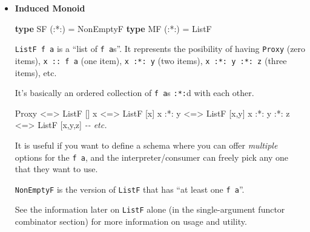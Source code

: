 \documentclass[]{article}
\newenvironment{Shaded}{}{}
\newcommand{\CommentTok}[1]{\textcolor[rgb]{0.38,0.63,0.69}{\textit{#1}}}
\newcommand{\DataTypeTok}[1]{\textcolor[rgb]{0.56,0.13,0.00}{#1}}
\newcommand{\KeywordTok}[1]{\textcolor[rgb]{0.00,0.44,0.13}{\textbf{#1}}}
\newcommand{\NormalTok}[1]{#1}
\newcommand{\OperatorTok}[1]{\textcolor[rgb]{0.40,0.40,0.40}{#1}}
\newcommand{\OtherTok}[1]{\textcolor[rgb]{0.00,0.44,0.13}{#1}}
\renewcommand{\href}[2]{#2\footnote{\url{#1}}}
\begin{document}
\begin{itemize}
  To introduce an ``empty'' branch, we need \texttt{Plus} (in
  \emph{\href{https://hackage.haskell.org/package/semigroupoids/docs/Data-Functor-Plus.html}{Data.Functor.Plus}}),
  which is like a higher-kinded \texttt{Monoid}, or \texttt{Alternative} with no
  \texttt{Applicative}:

\begin{Shaded}
\begin{Highlighting}[]
\KeywordTok{class} \DataTypeTok{Alt}\NormalTok{ f }\OtherTok{=>} \DataTypeTok{Plus}\NormalTok{ f }\KeywordTok{where}
\OtherTok{    zero ::}\NormalTok{ f a}
\end{Highlighting}
\end{Shaded}
\item
  \textbf{Induced Monoid}

\begin{Shaded}
\begin{Highlighting}[]
\KeywordTok{type} \DataTypeTok{SF}\NormalTok{ (}\OperatorTok{:*:}\NormalTok{) }\OtherTok{=} \DataTypeTok{NonEmptyF}
\KeywordTok{type} \DataTypeTok{MF}\NormalTok{ (}\OperatorTok{:*:}\NormalTok{) }\OtherTok{=} \DataTypeTok{ListF}
\end{Highlighting}
\end{Shaded}

  \texttt{ListF\ f\ a} is a ``list of \texttt{f\ a}s''. It represents the
  posibility of having \texttt{Proxy} (zero items), \texttt{x\ ::\ f\ a} (one
  item), \texttt{x\ :*:\ y} (two items), \texttt{x\ :*:\ y\ :*:\ z} (three
  items), etc.

  It's basically an ordered collection of \texttt{f\ a}s \texttt{:*:}d with each
  other.

\begin{Shaded}
\begin{Highlighting}[]
\DataTypeTok{Proxy}         \OperatorTok{<=>} \DataTypeTok{ListF}\NormalTok{ []}
\NormalTok{x             }\OperatorTok{<=>} \DataTypeTok{ListF}\NormalTok{ [x]}
\NormalTok{x }\OperatorTok{:*:}\NormalTok{ y       }\OperatorTok{<=>} \DataTypeTok{ListF}\NormalTok{ [x,y]}
\NormalTok{x }\OperatorTok{:*:}\NormalTok{ y }\OperatorTok{:*:}\NormalTok{ z }\OperatorTok{<=>} \DataTypeTok{ListF}\NormalTok{ [x,y,z]}
\CommentTok{{-}{-} etc.}
\end{Highlighting}
\end{Shaded}

  It is useful if you want to define a schema where you can offer
  \emph{multiple} options for the \texttt{f\ a}, and the interpreter/consumer
  can freely pick any one that they want to use.

  \texttt{NonEmptyF} is the version of \texttt{ListF} that has ``at least one
  \texttt{f\ a}''.

  See the information later on \texttt{ListF} alone (in the single-argument
  functor combinator section) for more information on usage and utility.
\end{itemize}
\end{document}

